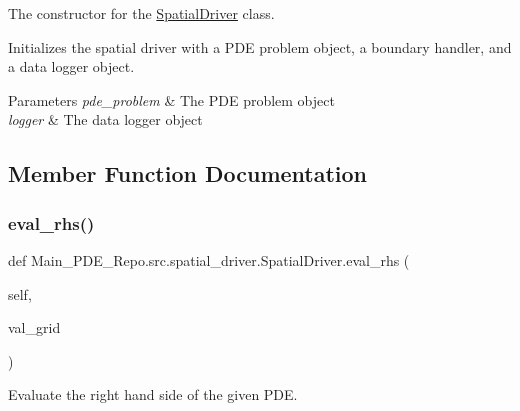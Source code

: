 The constructor for the \hyperlink{classMain__PDE__Repo_1_1src_1_1spatial__driver_1_1SpatialDriver}{Spatial\+Driver} class. 

Initializes the spatial driver with a P\+DE problem object, a boundary handler, and a data logger object. 
\begin{DoxyParams}{Parameters}
{\em pde\+\_\+problem} & The P\+DE problem object \\
\hline
{\em logger} & The data logger object \\
\hline
\end{DoxyParams}


\subsection{Member Function Documentation}
\mbox{\label{classMain__PDE__Repo_1_1src_1_1spatial__driver_1_1SpatialDriver_afcf6ad549e5939c1eb267144b26d2042}} 
\subsubsection{\texorpdfstring{eval\+\_\+rhs()}{eval\_rhs()}}
{\footnotesize\ttfamily def Main\+\_\+\+P\+D\+E\+\_\+\+Repo.\+src.\+spatial\+\_\+driver.\+Spatial\+Driver.\+eval\+\_\+rhs (\begin{DoxyParamCaption}\item[{}]{self,  }\item[{}]{val\+\_\+grid }\end{DoxyParamCaption})}



Evaluate the right hand side of the given P\+DE. 

